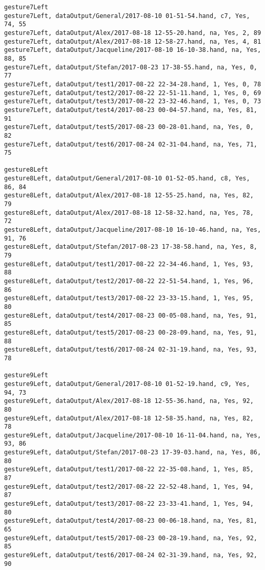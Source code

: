 \begin{verbatim}
gesture7Left
gesture7Left, dataOutput/General/2017-08-10 01-51-54.hand, c7, Yes, 74, 55
gesture7Left, dataOutput/Alex/2017-08-18 12-55-20.hand, na, Yes, 2, 89
gesture7Left, dataOutput/Alex/2017-08-18 12-58-27.hand, na, Yes, 4, 81
gesture7Left, dataOutput/Jacqueline/2017-08-10 16-10-38.hand, na, Yes, 88, 85
gesture7Left, dataOutput/Stefan/2017-08-23 17-38-55.hand, na, Yes, 0, 77
gesture7Left, dataOutput/test1/2017-08-22 22-34-28.hand, 1, Yes, 0, 78
gesture7Left, dataOutput/test2/2017-08-22 22-51-11.hand, 1, Yes, 0, 69
gesture7Left, dataOutput/test3/2017-08-22 23-32-46.hand, 1, Yes, 0, 73
gesture7Left, dataOutput/test4/2017-08-23 00-04-57.hand, na, Yes, 81, 91
gesture7Left, dataOutput/test5/2017-08-23 00-28-01.hand, na, Yes, 0, 82
gesture7Left, dataOutput/test6/2017-08-24 02-31-04.hand, na, Yes, 71, 75

gesture8Left
gesture8Left, dataOutput/General/2017-08-10 01-52-05.hand, c8, Yes, 86, 84
gesture8Left, dataOutput/Alex/2017-08-18 12-55-25.hand, na, Yes, 82, 79
gesture8Left, dataOutput/Alex/2017-08-18 12-58-32.hand, na, Yes, 78, 72
gesture8Left, dataOutput/Jacqueline/2017-08-10 16-10-46.hand, na, Yes, 91, 76
gesture8Left, dataOutput/Stefan/2017-08-23 17-38-58.hand, na, Yes, 8, 79
gesture8Left, dataOutput/test1/2017-08-22 22-34-46.hand, 1, Yes, 93, 88
gesture8Left, dataOutput/test2/2017-08-22 22-51-54.hand, 1, Yes, 96, 86
gesture8Left, dataOutput/test3/2017-08-22 23-33-15.hand, 1, Yes, 95, 80
gesture8Left, dataOutput/test4/2017-08-23 00-05-08.hand, na, Yes, 91, 85
gesture8Left, dataOutput/test5/2017-08-23 00-28-09.hand, na, Yes, 91, 88
gesture8Left, dataOutput/test6/2017-08-24 02-31-19.hand, na, Yes, 93, 78

gesture9Left
gesture9Left, dataOutput/General/2017-08-10 01-52-19.hand, c9, Yes, 94, 73
gesture9Left, dataOutput/Alex/2017-08-18 12-55-36.hand, na, Yes, 92, 80
gesture9Left, dataOutput/Alex/2017-08-18 12-58-35.hand, na, Yes, 82, 78
gesture9Left, dataOutput/Jacqueline/2017-08-10 16-11-04.hand, na, Yes, 93, 86
gesture9Left, dataOutput/Stefan/2017-08-23 17-39-03.hand, na, Yes, 86, 80
gesture9Left, dataOutput/test1/2017-08-22 22-35-08.hand, 1, Yes, 85, 87
gesture9Left, dataOutput/test2/2017-08-22 22-52-48.hand, 1, Yes, 94, 87
gesture9Left, dataOutput/test3/2017-08-22 23-33-41.hand, 1, Yes, 94, 80
gesture9Left, dataOutput/test4/2017-08-23 00-06-18.hand, na, Yes, 81, 65
gesture9Left, dataOutput/test5/2017-08-23 00-28-19.hand, na, Yes, 92, 85
gesture9Left, dataOutput/test6/2017-08-24 02-31-39.hand, na, Yes, 92, 90


\end{verbatim}
